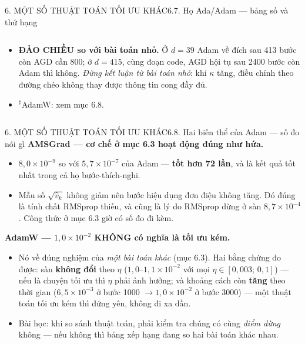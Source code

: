 \documentclass[aspectratio=169,11pt]{beamer}
\begin{document}
\begin{frame}{6. MỘT SỐ THUẬT TOÁN TỐI ƯU KHÁC}{6.7. Họ Ada/Adam --- bảng số và thứ hạng}
\begin{columns}[T]
\begin{column}{0.64\textwidth}
\begin{itemize}
              ở $t=0{,}4$. Chỉ Adam và AMSGrad vượt được. Cơ chế thích nghi \emph{không} miễn phí:
              nó đổi một bước dở lấy một bước trung bình, chứ không thay được việc dò bước tử tế.
        \item \textbf{ĐẢO CHIỀU so với bài toán nhỏ.} Ở $d=39$ Adam về đích sau 413 bước còn AGD
              cần 800; ở $d=415$, cùng đoạn code, AGD hội tụ sau \num{2400} bước còn Adam thì
              không. \emph{Đừng kết luận từ bài toán nhỏ}: khi $\kappa$ tăng, điều chỉnh theo
              đường chéo không thay được thông tin cong đầy đủ.
        \item $^\ddagger$AdamW: xem mục 6.8.
      \end{itemize}
    \end{column}
  \end{columns}
\end{frame}

\begin{frame}{6. MỘT SỐ THUẬT TOÁN TỐI ƯU KHÁC}{6.8. Hai biến thể của Adam --- số đo nói gì}
  \small
  \textbf{AMSGrad --- cơ chế ở mục 6.3 hoạt động đúng như hứa.}
  \begin{itemize}\footnotesize
    \item $8{,}0\times10^{-9}$ so với $5{,}7\times10^{-7}$ của Adam --- \textbf{tốt hơn 72 lần}, và
          là kết quả tốt nhất trong cả họ bước-thích-nghi.
    \item Mẫu số $\sqrt{\hat v_k}$ không giảm nên bước hiệu dụng đơn điệu không tăng. Đó đúng là
          tính chất RMSprop thiếu, và cũng là lý do RMSprop dừng ở sàn $8{,}7\times10^{-4}$.
          Công thức ở mục 6.3 giờ có số đo đi kèm.
  \end{itemize}
  \vspace{2pt}
  \textbf{AdamW --- $1{,}0\times10^{-2}$ KHÔNG có nghĩa là tối ưu kém.}
  \begin{itemize}\footnotesize
    \item Nó về đúng nghiệm của \emph{một bài toán khác} (mục 6.3). Hai bằng chứng đo được:
          sàn \textbf{không đổi} theo $\eta$ ($1{,}0$--$1{,}1\times10^{-2}$ với mọi
          $\eta\in[0{,}003;\,0{,}1]$) --- nếu là chuyện tối ưu thì $\eta$ phải ảnh hưởng; và
          khoảng cách còn \textbf{tăng} theo thời gian ($6{,}5\times10^{-3}$ ở bước \num{1000}
          $\to 1{,}0\times10^{-2}$ ở bước \num{3000}) --- một thuật toán tối ưu kém thì đứng yên,
          không đi xa dần.
    \item Bài học: khi so sánh thuật toán, phải kiểm tra chúng có cùng \emph{điểm dừng} không ---
          nếu không thì bảng xếp hạng đang so hai bài toán khác nhau.
  \end{itemize}
\end{frame}
\end{document}

